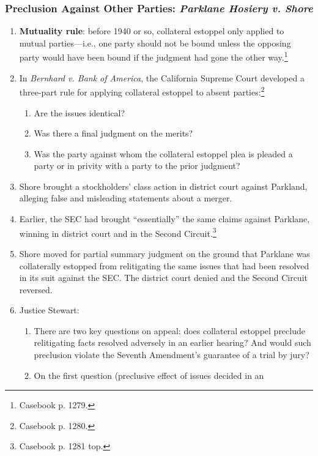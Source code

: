 \subsubsection{Preclusion Against Other Parties: \emph{Parklane Hosiery v. Shore}}

\begin{enumerate}
    \item \textbf{Mutuality rule}: before 1940 or so, collateral estoppel only 
    applied to mutual parties---i.e., one party should not be bound unless the 
    opposing party would have been bound if the judgment had gone the other 
    way.\footnote{Casebook p. 1279.}
    \item In \emph{Bernhard v. Bank of America}, the California Supreme Court 
    developed a three-part rule for applying collateral estoppel to absent 
    parties:\footnote{Casebook p. 1280.}
    \begin{enumerate}
        \item Are the issues identical?
        \item Was there a final judgment on the merits?
        \item Was the party against whom the collateral estoppel plea is 
        pleaded a party or in privity with a party to the prior judgment?
    \end{enumerate}
    \item Shore brought a stockholders' class action  in district court 
    against Parkland, alleging false and misleading statements about a merger.
    \item Earlier, the SEC had brought ``essentially'' the same claims against 
    Parklane, winning in district court and in the Second 
    Circuit.\footnote{Casebook p. 1281 top.}
    \item Shore moved for partial summary judgment on the ground that Parklane 
    was collaterally estopped from relitigating the same issues that had been 
    resolved in its suit against the SEC. The district court denied and the 
    Second Circuit reversed.
    \item Justice Stewart:
    \begin{enumerate}
        \item There are two key questions on appeal: does collateral estoppel 
        preclude relitigating facts resolved adversely in an earlier hearing? 
        And would such preclusion violate the Seventh Amendment's guarantee of 
        a trial by jury?
        \item On the first question (preclusive effect of issues decided in an 

\end{enumerate}
\end{enumerate}
